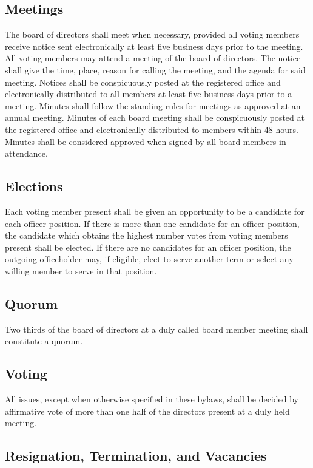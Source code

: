 \documentclass[10pt,letterpaper,titlepage]{article}
\begin{document}
\subsection{Meetings}

The board of directors shall meet when necessary, provided all voting members
receive notice sent electronically at least five business days prior to the
meeting.
All voting members may attend a meeting of the board of directors.
The notice shall give the time, place, reason for calling the meeting, and the
agenda for said meeting.
Notices shall be conspicuously posted at the registered office and
electronically distributed to all members at least five business days prior to
a meeting.
Minutes shall follow the standing rules for meetings as approved at an annual
meeting.
Minutes of each board meeting shall be conspicuously posted at the registered
office and electronically distributed to members within 48 hours.
Minutes shall be considered approved when signed by all board members in
attendance.

\subsection{Elections}
\label{elections}

Each voting member present shall be given an opportunity to be a candidate for each
officer position.
If there is more than one candidate for an officer position, the candidate
which obtains the highest number votes from voting members present shall be
elected.
If there are no candidates for an officer position, the outgoing officeholder
may, if eligible, elect to serve another term or select any willing member to
serve in that position.

\subsection{Quorum}

Two thirds of the board of directors at a duly called board member meeting shall
constitute a quorum.

\subsection{Voting}

All issues, except when otherwise specified in these bylaws, shall be decided
by affirmative vote of more than one half of the directors present at a duly held
meeting.

\subsection{Resignation, Termination, and Vacancies}
\end{document}
